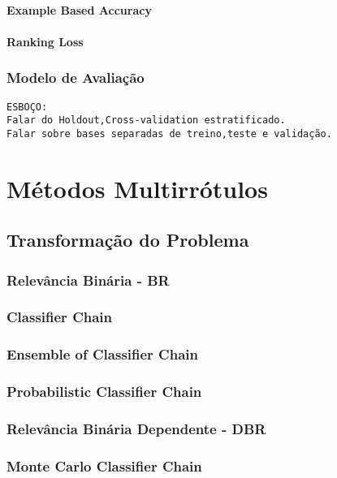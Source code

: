 \subsubsection{Example Based Accuracy}
\subsubsection{Ranking Loss}
\subsection{Modelo de Avaliação}
\label{sec:modelav}

\begin{verbatim}
ESBOÇO:
Falar do Holdout,Cross-validation estratificado.
Falar sobre bases separadas de treino,teste e validação.
\end{verbatim}

\chapter{Métodos Multirrótulos}
\section{Transformação do Problema}
\subsection{Relevância Binária - BR}
\label{sec:br}
\cite{br2010}
\subsection{Classifier Chain}
\cite{cc2009}
\subsection{Ensemble of Classifier Chain}
\subsection{Probabilistic Classifier Chain}
\subsection{Relevância Binária Dependente - DBR}
\label{sec:dbr}
\subsection{Monte Carlo Classifier Chain}
\cite{mcc2012}

